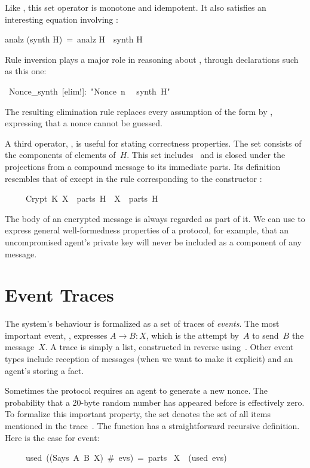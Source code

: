 Like , this set operator is monotone and idempotent.  It also
satisfies an interesting equation involving :
\begin{isabelle}
analz (synth H)\ =\ analz H\ \isasymunion\ synth H
\end{isabelle}
%
Rule inversion plays a major role in reasoning about , through
declarations such as this one:
\begin{isabelle}
\ Nonce_synth\ [elim!]:\ "Nonce\ n\ \isasymin
\ synth\ H"
\end{isabelle}
%
The resulting elimination rule replaces every assumption of the form
 by , expressing that a nonce cannot be guessed.  

%
A third operator, , is useful for stating correctness
properties.  The set
 consists of the components of elements of~$H$.  This set
includes~\isa{H} and is closed under the projections from a compound
message to its immediate parts. 
Its definition resembles that of  except in the rule
corresponding to the constructor : 
\begin{isabelle}
\ \ \ \ \ Crypt\ K\ X\ \isasymin \ parts\ H\ \isasymLongrightarrow\ X\
\isasymin \ parts\ H
\end{isabelle}
The body of an encrypted message is always regarded as part of it.  We can
use \isa{parts} to express general well-formedness properties of a protocol,
for example, that an uncompromised agent's private key will never be
included as a component of any message.


\section{Event Traces}\label{sec:events}

The system's behaviour is formalized as a set of traces of
\emph{events}.  The most important event, , expresses
$A\to B : X$, which is the attempt by~$A$ to send~$B$ the message~$X$.
A trace is simply a list, constructed in reverse
using~\isa{\#}.  Other event types include reception of messages (when
we want to make it explicit) and an agent's storing a fact.

Sometimes the protocol requires an agent to generate a new nonce. The
probability that a 20-byte random number has appeared before is effectively
zero.  To formalize this important property, the set \isa{used evs}
denotes the set of all items mentioned in the trace~\isa{evs}.
The function \isa{used} has a straightforward
recursive definition.  Here is the case for \isa{Says} event:
\begin{isabelle}
\ \ \ \ \ used\ ((Says\ A\ B\ X)\ \#\ evs)\ =\ parts\ \isacharbraceleft
X\isacharbraceright \ \isasymunion\ (used\ evs)
\end{isabelle}

